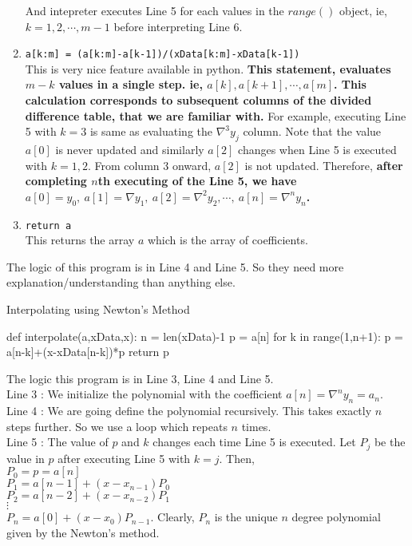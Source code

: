 \begin{commentary}
\begin{enumerate}[label=Line \arabic*]
		And intepreter executes Line 5 for each values in the $range()$ object, ie, $k=1,2,\cdots, m-1$ before interpreting Line 6.
	\item \texttt{a[k:m] = (a[k:m]-a[k-1])/(xData[k:m]-xData[k-1])}\\
		This is very nice feature available in python.
		\textbf{
			This statement, evaluates $m-k$ values in a single step.
			ie, $a[k],a[k+1],\cdots,a[m]$.
			This calculation corresponds to subsequent columns of the divided difference table, that we are familiar with.
		}
		For example, executing Line 5 with $k=3$ is same as evaluating the $\nabla^3y_j$ column.
		Note that the value $a[0]$ is never updated and similarly $a[2]$ changes when Line 5 is executed with $k=1,2$.
		From column 3 onward, $a[2]$ is not updated.
		Therefore, \textbf{after completing $n$th executing of the Line 5, we have $a[0] = y_0,\ a[1]=\nabla y_1,\ a[2]=\nabla^2 y_2,\cdots,\ a[n]=\nabla^n y_n$.}
	\item \texttt{return a}\\
		This returns the array $a$ which is the array of coefficients.
\end{enumerate}
	The logic of this program is in Line 4 and Line 5.
	So they need more explanation/understanding than anything else.
\end{commentary}

\begin{program}Interpolating using Newton's Method
	\begin{python}
		def interpolate(a,xData,x):
			n = len(xData)-1
			p = a[n]
			for k in range(1,n+1):
				p = a[n-k]+(x-xData[n-k])*p
			return p
	\end{python}
	The logic this program is in Line 3, Line 4 and Line 5.\\

	Line 3 : We initialize the polynomial with the coefficient $a[n] = \nabla^n y_n = a_n$.\\

	Line 4 : We are going define the polynomial recursively.
	This takes exactly $n$ steps further.
	So we use a loop which repeats $n$ times.\\

	Line 5 : The value of $p$ and $k$ changes each time Line 5 is executed.
	Let $P_j$ be the value in $p$ after executing Line 5 with $k=j$.
	Then,\\ $P_0 = p = a[n]$\\ $P_1 = a[n-1]+(x-x_{n-1})P_0$\\ $P_2 = a[n-2]+(x-x_{n-2})P_1$\\ $\vdots$\\ $P_n = a[0]+(x-x_0)P_{n-1}$.
	Clearly, $P_n$ is the unique $n$ degree polynomial given by the Newton's method.
\end{program}


